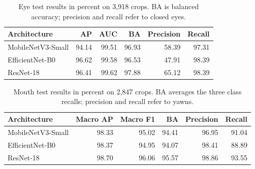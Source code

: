 \begin{table}[htbp]
\caption{Eye test results in percent on 3,918 crops. BA is balanced accuracy; precision and recall refer to closed eyes.}\label{tab:eye-results}
\begin{tabularx}{\textwidth}{@{}Yrrrrr@{}}
\toprule
Architecture & AP & AUC & BA & Precision & Recall \\
\midrule
MobileNetV3-Small & 94.14 & 99.51 & 96.93 & 58.39 & 97.31 \\
EfficientNet-B0 & 96.62 & 99.58 & 96.53 & 47.91 & 98.39 \\
ResNet-18 & 96.41 & 99.62 & 97.88 & 65.12 & 98.39 \\
\bottomrule
\end{tabularx}
\end{table}

\begin{table}[htbp]
\caption{Mouth test results in percent on 2,847 crops. BA averages the three class recalls; precision and recall refer to yawns.}\label{tab:mouth-results}
\begin{tabularx}{\textwidth}{@{}Yrrrrr@{}}
\toprule
Architecture & Macro AP & Macro F1 & BA & Precision & Recall \\
\midrule
MobileNetV3-Small & 98.33 & 95.02 & 94.41 & 96.95 & 91.04 \\
EfficientNet-B0 & 98.37 & 94.95 & 94.07 & 98.41 & 88.89 \\
ResNet-18 & 98.70 & 96.06 & 95.57 & 98.86 & 93.55 \\
\bottomrule
\end{tabularx}
\end{table}
